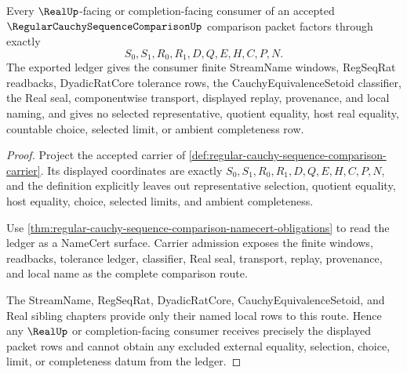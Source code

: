 \begin{theorem}
\label{thm:regular-cauchy-sequence-comparison-ledger-exactness}
Every $\RealUp$-facing or completion-facing consumer of an accepted $\RegularCauchySequenceComparisonUp$ comparison packet factors through exactly
$$
S_0,S_1,R_0,R_1,D,Q,E,H,C,P,N.
$$
The exported ledger gives the consumer finite StreamName windows, RegSeqRat readbacks, DyadicRatCore tolerance rows, the CauchyEquivalenceSetoid classifier, the Real seal, componentwise transport, displayed replay, provenance, and local naming, and gives no selected representative, quotient equality, host real equality, countable choice, selected limit, or ambient completeness row.
\end{theorem}
\begin{proof}
Project the accepted carrier of \autoref{def:regular-cauchy-sequence-comparison-carrier}. Its displayed coordinates are exactly $S_0,S_1,R_0,R_1,D,Q,E,H,C,P,N$, and the definition explicitly leaves out representative selection, quotient equality, host equality, choice, selected limits, and ambient completeness.

Use \autoref{thm:regular-cauchy-sequence-comparison-namecert-obligations} to read the ledger as a NameCert surface. Carrier admission exposes the finite windows, readbacks, tolerance ledger, classifier, Real seal, transport, replay, provenance, and local name as the complete comparison route.

The StreamName, RegSeqRat, DyadicRatCore, CauchyEquivalenceSetoid, and Real sibling chapters provide only their named local rows to this route. Hence any $\RealUp$ or completion-facing consumer receives precisely the displayed packet rows and cannot obtain any excluded external equality, selection, choice, limit, or completeness datum from the ledger.
\end{proof}

